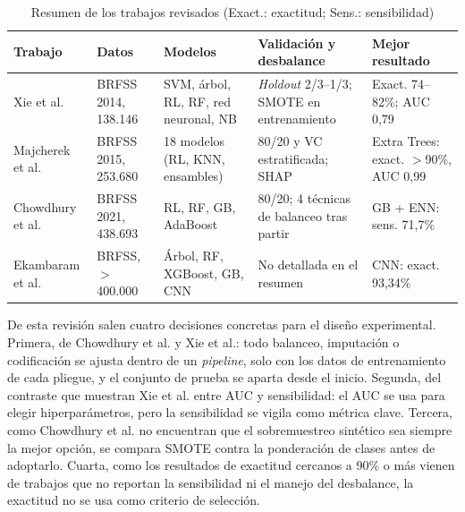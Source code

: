 \begin{table}[!t]
\centering
\caption{Resumen de los trabajos revisados (Exact.: exactitud; Sens.: sensibilidad)}
\label{tab:estado}
\footnotesize
\setlength{\tabcolsep}{2.5pt}
\begin{tabular}{@{}L{1.5cm}L{1.3cm}L{1.8cm}L{1.85cm}L{1.55cm}@{}}
\toprule
\textbf{Trabajo} & \textbf{Datos} & \textbf{Modelos} & \textbf{Validación y desbalance} & \textbf{Mejor resultado} \\
\midrule
Xie et al. \cite{xie2019} & BRFSS 2014, 138.146 & SVM, árbol, RL, RF, red neuronal, NB & \textit{Holdout} 2/3--1/3; SMOTE en entrenamiento & Exact. 74--82\%; AUC 0,79 \\
\addlinespace
Majcherek et al. \cite{majcherek2025} & BRFSS 2015, 253.680 & 18 modelos (RL, KNN, ensambles) & 80/20 y VC estratificada; SHAP & Extra Trees: exact. $>$90\%, AUC 0,99 \\
\addlinespace
Chowdhury et al. \cite{chowdhury2024} & BRFSS 2021, 438.693 & RL, RF, GB, AdaBoost & 80/20; 4 técnicas de balanceo tras partir & GB + ENN: sens. 71,7\% \\
\addlinespace
Ekambaram et al. \cite{ekambaram2026} & BRFSS, $>$400.000 & Árbol, RF, XGBoost, GB, CNN & No detallada en el resumen & CNN: exact. 93,34\% \\
\bottomrule
\end{tabular}
\end{table}

De esta revisión salen cuatro decisiones concretas para el diseño experimental. Primera, de Chowdhury et al. y Xie et al.: todo balanceo, imputación o codificación se ajusta dentro de un \textit{pipeline}, solo con los datos de entrenamiento de cada pliegue, y el conjunto de prueba se aparta desde el inicio. Segunda, del contraste que muestran Xie et al. entre AUC y sensibilidad: el AUC se usa para elegir hiperparámetros, pero la sensibilidad se vigila como métrica clave. Tercera, como Chowdhury et al. no encuentran que el sobremuestreo sintético sea siempre la mejor opción, se compara SMOTE contra la ponderación de clases antes de adoptarlo. Cuarta, como los resultados de exactitud cercanos a 90\% o más vienen de trabajos que no reportan la sensibilidad ni el manejo del desbalance, la exactitud no se usa como criterio de selección.

